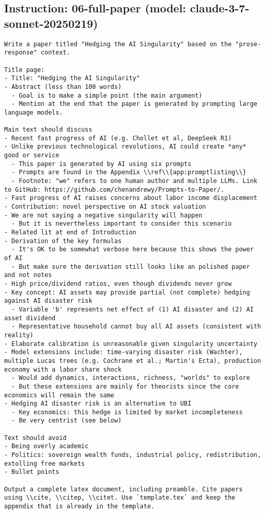 \subsection*{Instruction: 06-full-paper  (model: claude-3-7-sonnet-20250219)}
\vspace{-1ex}
\begin{lstlisting}[language=text,breaklines=true,frame=single]
Write a paper titled "Hedging the AI Singularity" based on the "prose-response" context.

Title page:
- Title: "Hedging the AI Singularity"  
- Abstract (less than 100 words)
  - Goal is to make a simple point (the main argument)
  - Mention at the end that the paper is generated by prompting large language models.

Main text should discuss
- Recent fast progress of AI (e.g. Chollet et al, DeepSeek R1)
- Unlike previous technological revolutions, AI could create *any* good or service
  - This paper is generated by AI using six prompts 
  - Prompts are found in the Appendix \\ref\\{app:promptlisting\\}
  - Footnote: "we" refers to one human author and multiple LLMs. Link to GitHub: https://github.com/chenandrewy/Prompts-to-Paper/.
- Fast progress of AI raises concerns about labor income displacement
- Contribution: novel perspective on AI stock valuation        
- We are not saying a negative singularity will happen
  - But it is nevertheless important to consider this scenario        
- Related lit at end of Introduction
- Derivation of the key formulas
  - It's OK to be somewhat verbose here because this shows the power of AI
  - But make sure the derivation still looks like an polished paper and not notes
- High price/dividend ratios, even though dividends never grow
- Key concept: AI assets may provide partial (not complete) hedging against AI disaster risk
  - Variable 'b' represents net effect of (1) AI disaster and (2) AI asset dividend
  - Representative household cannot buy all AI assets (consistent with reality)
- Elaborate calibration is unreasonable given singularity uncertainty
- Model extensions include: time-varying disaster risk (Wachter), multiple Lucas trees (e.g. Cochrane et al.; Martin's Ecta), production economy with a labor share shock
  - Would add dynamics, interactions, richness, "worlds" to explore 
  - But these extensions are mainly for theorists since the core economics will remain the same
- Hedging AI disaster risk is an alternative to UBI
  - Key economics: this hedge is limited by market incompleteness
  - Be very centrist (see below)

Text should avoid      
- Being overly academic
- Politics: sovereign wealth funds, industrial policy, redistribution, extolling free markets
- Bullet points

Output a complete latex document, including preamble. Cite papers using \\cite, \\citep, \\citet. Use `template.tex` and keep the appendix that is already in the template.

\end{lstlisting}
\vspace{-3ex}